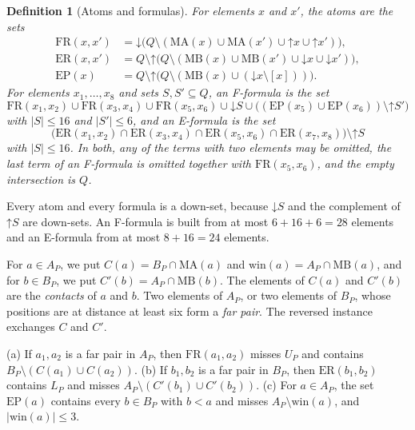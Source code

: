 \documentclass[pdflatex,sn-mathphys-num]{sn-jnl}%
\theoremstyle{thmstyleone}%
\theoremstyle{thmstyletwo}%
\theoremstyle{thmstylethree}%
\newtheorem{definition}{Definition}%
\newcommand{\dn}{\mathord{\downarrow}}%
\newcommand{\upp}{\mathord{\uparrow}}%
\newcommand{\MB}{\mathrm{MB}}%
\newcommand{\MA}{\mathrm{MA}}%
\newcommand{\win}{\mathrm{win}}%
\newcommand{\FR}{\mathrm{FR}}%
\newcommand{\ER}{\mathrm{ER}}%
\newcommand{\EP}{\mathrm{EP}}%
\begin{document}
\begin{definition}[Atoms and formulas]
\label{def:pa-atoms}
For elements $x$ and $x'$, the \emph{atoms} are the sets
\begin{align*}
\FR(x, x') &= \dn \bigl(Q \setminus (\MA(x) \cup \MA(x') \cup \upp x \cup \upp x')\bigr),\\
\ER(x, x') &= Q \setminus \upp \bigl(Q \setminus (\MB(x) \cup \MB(x') \cup \dn x \cup \dn x')\bigr),\\
\EP(x) &= Q \setminus \upp \bigl(Q \setminus (\MB(x) \cup (\dn x \setminus [x]))\bigr).
\end{align*}
For elements $x_1, \dots, x_8$ and sets $S, S' \subseteq Q$, an \emph{F-formula} is the set
\[
\FR(x_1, x_2) \cup \FR(x_3, x_4) \cup \FR(x_5, x_6) \cup \dn S \cup \bigl((\EP(x_5) \cup \EP(x_6)) \setminus \upp S'\bigr)
\]
with $|S| \leq 16$ and $|S'| \leq 6$, and an \emph{E-formula} is the set
\[
\bigl(\ER(x_1, x_2) \cap \ER(x_3, x_4) \cap \ER(x_5, x_6) \cap \ER(x_7, x_8)\bigr) \setminus \upp S
\]
with $|S| \leq 16$.
In both, any of the terms with two elements may be omitted, the last term of an F-formula is omitted together with $\FR(x_5, x_6)$, and the empty intersection is $Q$.
\end{definition}

Every atom and every formula is a down-set, because $\dn S$ and the complement of $\upp S$ are down-sets.
An F-formula is built from at most $6 + 16 + 6 = 28$ elements and an E-formula from at most $8 + 16 = 24$ elements.

For $a \in A_P$, we put $C(a) = B_P \cap \MA(a)$ and $\win(a) = A_P \cap \MB(a)$, and for $b \in B_P$, we put $C'(b) = A_P \cap \MB(b)$.
The elements of $C(a)$ and $C'(b)$ are the \emph{contacts} of $a$ and $b$.
Two elements of $A_P$, or two elements of $B_P$, whose positions are at distance at least six form a \emph{far pair}.
The reversed instance exchanges $C$ and $C'$.

\begin{lemma}[Atoms]
\label{lem:pa-atoms}
(a) If $a_1, a_2$ is a far pair in $A_P$, then $\FR(a_1, a_2)$ misses $U_P$ and contains $B_P \setminus (C(a_1) \cup C(a_2))$.
(b) If $b_1, b_2$ is a far pair in $B_P$, then $\ER(b_1, b_2)$ contains $L_P$ and misses $A_P \setminus (C'(b_1) \cup C'(b_2))$.
(c) For $a \in A_P$, the set $\EP(a)$ contains every $b \in B_P$ with $b < a$ and misses $A_P \setminus \win(a)$, and $|\win(a)| \leq 3$.
\end{lemma}
\end{document}

